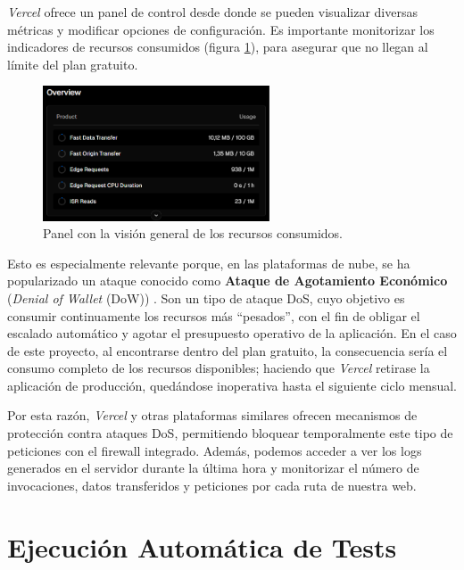 \textit{Vercel} ofrece un panel de control desde donde se pueden visualizar diversas métricas y modificar opciones de configuración. Es importante monitorizar los indicadores de recursos consumidos (figura \ref{fig:usage_overview}), para asegurar que no llegan al límite del plan gratuito.

\begin{figure}[H]
    \centering
    \includegraphics[width=0.6\textwidth]{figures/despliegue/usage_overview.png}
    \caption{Panel con la visión general de los recursos consumidos.}
    \label{fig:usage_overview}
\end{figure}

\newpage

Esto es especialmente relevante porque, en las plataformas de nube, se ha popularizado un ataque conocido como \textbf{Ataque de Agotamiento Económico} (\textit{Denial of Wallet} (DoW)) \cite{vercelDoW2025}. Son un tipo de ataque DoS, cuyo objetivo es consumir continuamente los recursos más ``pesados'', con el fin de obligar el escalado automático y agotar el presupuesto operativo de la aplicación. En el caso de este proyecto, al encontrarse dentro del plan gratuito, la consecuencia sería el consumo completo de los recursos disponibles; haciendo que \textit{Vercel} retirase la aplicación de producción, quedándose inoperativa hasta el siguiente ciclo mensual.

Por esta razón, \textit{Vercel} y otras plataformas similares ofrecen mecanismos de protección contra ataques DoS, permitiendo bloquear temporalmente este tipo de peticiones con el firewall integrado. Además, podemos acceder a ver los logs generados en el servidor durante la última hora y monitorizar el número de invocaciones, datos transferidos y peticiones por cada ruta de nuestra web.

\section{Ejecución Automática de Tests} \label{sec:test_automaticos}

